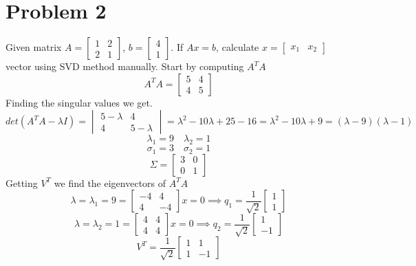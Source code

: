 \documentclass{article}
\begin{document}
\section*{Problem 2}
Given matrix $A = \begin{bmatrix} 1 & 2 \\ 2 & 1 \end{bmatrix}$, $b = \begin{bmatrix}4\\1\end{bmatrix}$.
\newline
If $Ax=b$, calculate $x = \begin{bmatrix} x_1 & x_2 \end{bmatrix}$ vector using SVD method manually.
\newline
Start by computing $A^TA$
$$A^TA
=
\begin{bmatrix}
5 & 4 \\
4 & 5
\end{bmatrix}
$$
Finding the singular values we get.
$$
det(A^TA - \lambda I)
=
\begin{vmatrix}
5-\lambda & 4 \\
4 & 5-\lambda
\end{vmatrix}
=
\lambda^2 -10\lambda + 25 - 16
=
\lambda^2 -10\lambda + 9
=
(\lambda - 9)(\lambda - 1)
$$
$$ \lambda_1 = 9 \quad \lambda_2 = 1 $$
$$ \sigma_1 = 3 \quad \sigma_2 = 1 $$
$$ \Sigma = \begin{bmatrix} 3 & 0 \\ 0 & 1 \end{bmatrix} $$
Getting $V^T$ we find the eigenvectors of $A^TA$
$$\lambda = \lambda_1 = 9 =
\begin{bmatrix}
-4 & 4 \\
4 & -4
\end{bmatrix}
x
= 0
\implies
q_1
=
\frac{1}{\sqrt{2}}
\begin{bmatrix}
1 \\
1
\end{bmatrix}
$$
$$\lambda = \lambda_2 = 1 =
\begin{bmatrix}
4 & 4 \\
4 & 4
\end{bmatrix}
x
= 0
\implies
q_2
=
\frac{1}{\sqrt{2}}
\begin{bmatrix}
1 \\
-1
\end{bmatrix}
$$
$$
V^T =
\frac{1}{\sqrt{2}}
\begin{bmatrix}
1 & 1 \\
1 & -1
\end{bmatrix}
$$
\end{document}

